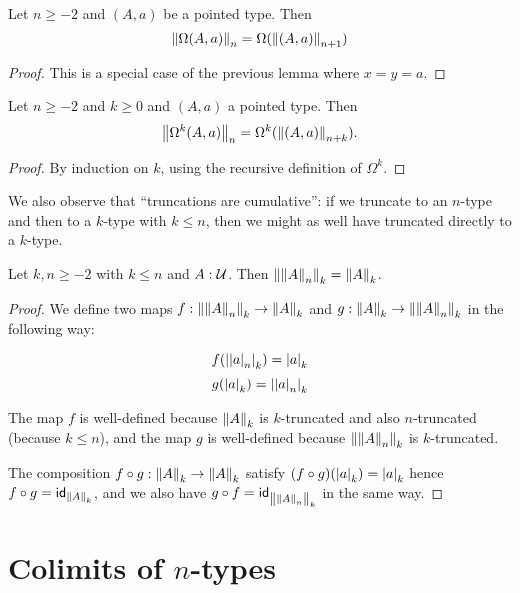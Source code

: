 \begin{cor}
  Let $n\ge-2$ and $(A,a)$ be a pointed type. Then
  \[\trunc n{\Omega(A,a)}=\Omega(\trunc{n+1}{(A,a)})\]
\end{cor}
\begin{proof}
  This is a special case of the previous lemma where $x=y=a$.
\end{proof}

\begin{cor}
  Let $n\ge -2$ and $k\ge 0$ and $(A,a)$ a pointed type.  Then
  \[\trunc n{\Omega^k(A,a)} = \Omega^k(\trunc{n+k}{(A,a)}). \]
\end{cor}
\begin{proof}
  By induction on $k$, using the recursive definition of $\Omega^k$.
\end{proof}

We also observe that ``truncations are cumulative'': if we truncate to an $n$-type and then to a $k$-type with $k\le n$, then we might as
well have truncated directly to a $k$-type.

\begin{lem}
  Let $k,n\ge-2$ with $k\le{}n$ and $A:\type$. Then
  $\trunc k{\trunc nA}=\trunc kA$.
\end{lem}
\begin{proof}
  We define two maps $f:\trunc k{\trunc nA}\to\trunc kA$ and
  $g:\trunc kA\to\trunc k{\trunc nA}$ in the following way:

  \[f(\tproj k{\tproj na})=\tproj ka\]
  \[g(\tproj ka)=\tproj k{\tproj na}\]

  The map $f$ is well-defined because $\trunc kA$ is $k$-truncated and also
  $n$-truncated (because $k\le{}n$), and the map $g$ is well-defined because
  $\trunc k{\trunc nA}$ is $k$-truncated.

  The composition $f\circ{}g:\trunc kA\to\trunc kA$ satisfy
  $(f\circ{}g)(\tproj ka)=\tproj ka$ hence $f\circ{}g=\idfunc[\trunc kA]$, and
  we also have $g\circ{}f=\idfunc[\trunc k{\trunc nA}]$ in the same way.
\end{proof}



\section{Colimits of $n$-types}
\label{sec:pushouts}

